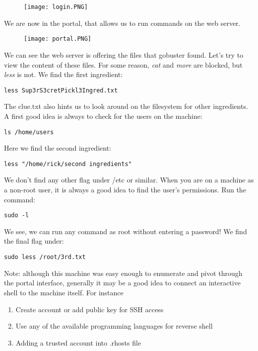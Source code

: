 \documentclass{article}
\begin{document}
\begin{figure}[H]
    \texttt{[image: login.PNG]}
\end{figure}

We are now in the portal, that allows us to run commands on the web server.

\begin{figure}[H]
    \texttt{[image: portal.PNG]}
\end{figure}
We can see the web server is offering the files that gobuster found. Let's try to view the content of these files. For some reason, \textit{cat} and \textit{more} are blocked, but \textit{less} is not. We find the first ingredient:

\begin{lstlisting}
less Sup3rS3cretPickl3Ingred.txt
\end{lstlisting}

The clue.txt also hints us to look around on the filesystem for other ingredients. A first good idea is always to check for the users on the machine:

\begin{lstlisting}
ls /home/users
\end{lstlisting}

Here we find the second ingredient:

\begin{lstlisting}
less "/home/rick/second ingredients"
\end{lstlisting}

We don't find any other flag under /etc or similar. When you are on a machine as a non-root user, it is always a good idea to find the user's permissions. Run the command: 
\begin{lstlisting}
sudo -l
\end{lstlisting}
We see, we can run any command as root without entering a password! We find the final flag under:

\begin{lstlisting}
sudo less /root/3rd.txt
\end{lstlisting}

Note: although this machine was easy enough to enumerate and pivot through the portal interface, generally it may be a good idea to connect an interactive shell to the machine itself. For instance


\begin{enumerate}
    \item Create account or add public key for SSH access
    \item Use any of the available programming languages for reverse shell
    \item Adding a trusted account into .rhosts file
\end{enumerate}
\end{document}
